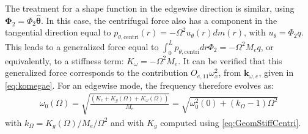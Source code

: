 \documentclass[wes, manuscript]{copernicus}
\renewcommand{\v}[1]{\boldsymbol{#1}}
\begin{document}
The treatment for a shape function in the edgewise direction is similar, using $\v{\Phi}_2=\Phi_2 \v{\hat{\theta}}$. In this case, the centrifugal force also has a component in the tangential direction equal to $p_{\theta,\text{centri}}(r) = -\Omega^2u_\theta(r) dm(r)$, with $u_\theta=\Phi_2 q$. 
This leads to a generalized force equal to $\int_0^L p_{\theta,\text{centri}} dr \Phi_2=-\Omega^2 M_{e} q$, or equivalently, to a stiffness term: $K_{\omega}=-\Omega^2 M_{e}$. It can be verified that this generalized force corresponds to the contribution $O_{e,11}\omega_x^2$, from $\v{k}_{\omega,e}$, given in \autoref{eq:komegae}. For an edgewise mode, the frequency therefore evolves as: 
\begin{align}
 \omega_0(\Omega)=\sqrt{\frac{(K_{e}+ K_g(\Omega)+K_\omega(\Omega))}{M_e}}=\sqrt{\omega_0^2(0)+(k_\Omega-1)\Omega^2}
\end{align}
 with $k_\Omega=K_g(\Omega)/M_e/\Omega^2$ and with $K_g$ computed using \autoref{eq:GeomStiffCentri}.
\end{document}
